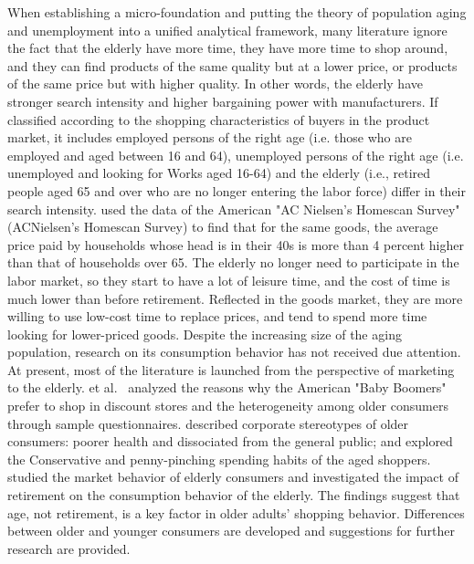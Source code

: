 \documentclass[ %
    final,
    scrbook,
    listoffigures,
    listoftables, 
    glossary]{cu-thesis}
\begin{document}
When establishing a micro-foundation and putting the theory of population aging and unemployment into a unified analytical framework, many literature ignore the fact that the elderly have more time, they have more time to shop around, and they can find products of the same quality but at a lower price, or products of the same price but with higher quality. In other words, the elderly have stronger search intensity and higher bargaining power with manufacturers. If classified according to the shopping characteristics of buyers in the product market, it includes employed persons of the right age (i.e. those who are employed and aged between 16 and 64), unemployed persons of the right age (i.e. unemployed and looking for Works aged 16-64) and the elderly (i.e., retired people aged 65 and over who are no longer entering the labor force) differ in their search intensity. \cite{aguiar2007life} used the data of the American "AC Nielsen's Homescan Survey" (ACNielsen's Homescan Survey) to find that for the same goods, the average price paid by households whose head is in their 40s is more than 4 percent higher than that of households over 65. The elderly no longer need to participate in the labor market, so they start to have a lot of leisure time, and the cost of time is much lower than before retirement. Reflected in the goods market, they are more willing to use low-cost time to replace prices, and tend to spend more time looking for lower-priced goods. Despite the increasing size of the aging population, research on its consumption behavior has not received due attention. At present, most of the literature is launched from the perspective of marketing to the elderly.  et al.~\cite{swinyard1994six} analyzed the reasons why the American "Baby Boomers" prefer to shop in discount stores and the heterogeneity among older consumers through sample questionnaires. \cite{moschis1997targeting} described corporate stereotypes of older consumers: poorer health and dissociated from the general public; \cite{szmigin2001learning} and \cite{myers2008understanding} explored the Conservative and penny-pinching spending habits of the aged shoppers. \cite{hawes1984understanding} studied the market behavior of elderly consumers and investigated the impact of retirement on the consumption behavior of the elderly. The findings suggest that age, not retirement, is a key factor in older adults' shopping behavior. Differences between older and younger consumers are developed and suggestions for further research are provided.


\fi
\end{document}
